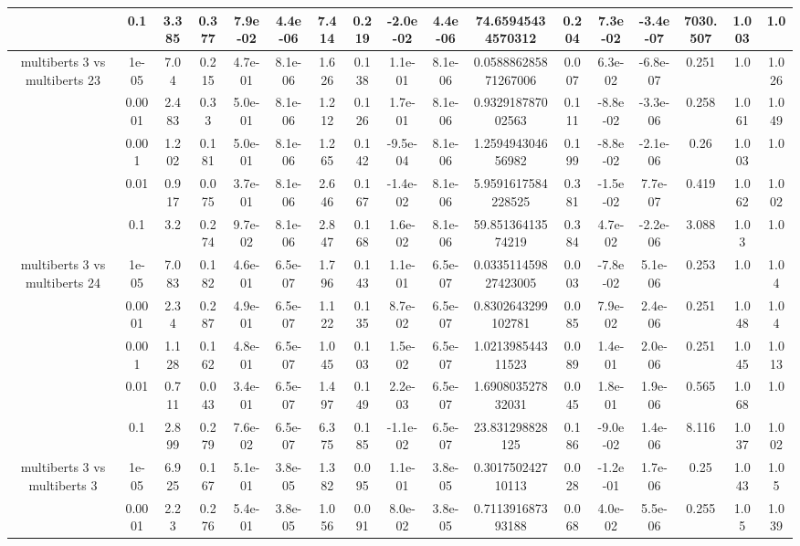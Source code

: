 \begin{tabular}{|c|c|c|c|c|c|c|c|c|c|c|c|c|c|c|c|c|}
 & 0.1 & 3.385 & 0.377 & 7.9e-02 & 4.4e-06 & 7.414 & 0.219 & -2.0e-02 & 4.4e-06 & 74.65945434570312 & 0.204 & 7.3e-02 & -3.4e-07 & 7030.507 & 1.003 & 1.0 \\
\hline
\multirow{5}{*}{multiberts 3 vs multiberts 23} & 1e-05 & 7.04 & 0.215 & 4.7e-01 & 8.1e-06 & 1.626 & 0.138 & 1.1e-01 & 8.1e-06 & 0.058886285871267006 & 0.007 & 6.3e-02 & -6.8e-07 & 0.251 & 1.0 & 1.026 \\
 & 0.0001 & 2.483 & 0.33 & 5.0e-01 & 8.1e-06 & 1.212 & 0.126 & 1.7e-01 & 8.1e-06 & 0.932918787002563 & 0.111 & -8.8e-02 & -3.3e-06 & 0.258 & 1.061 & 1.049 \\
 & 0.001 & 1.202 & 0.181 & 5.0e-01 & 8.1e-06 & 1.265 & 0.142 & -9.5e-04 & 8.1e-06 & 1.259494304656982 & 0.199 & -8.8e-02 & -2.1e-06 & 0.26 & 1.003 & 1.0 \\
 & 0.01 & 0.917 & 0.075 & 3.7e-01 & 8.1e-06 & 2.646 & 0.167 & -1.4e-02 & 8.1e-06 & 5.9591617584228525 & 0.381 & -1.5e-02 & 7.7e-07 & 0.419 & 1.062 & 1.002 \\
 & 0.1 & 3.2 & 0.274 & 9.7e-02 & 8.1e-06 & 2.847 & 0.168 & 1.6e-02 & 8.1e-06 & 59.85136413574219 & 0.384 & 4.7e-02 & -2.2e-06 & 3.088 & 1.03 & 1.0 \\
\hline
\multirow{5}{*}{multiberts 3 vs multiberts 24} & 1e-05 & 7.083 & 0.182 & 4.6e-01 & 6.5e-07 & 1.796 & 0.143 & 1.1e-01 & 6.5e-07 & 0.033511459827423005 & 0.003 & -7.8e-02 & 5.1e-06 & 0.253 & 1.0 & 1.04 \\
 & 0.0001 & 2.34 & 0.287 & 4.9e-01 & 6.5e-07 & 1.122 & 0.135 & 8.7e-02 & 6.5e-07 & 0.8302643299102781 & 0.085 & 7.9e-02 & 2.4e-06 & 0.251 & 1.048 & 1.04 \\
 & 0.001 & 1.128 & 0.162 & 4.8e-01 & 6.5e-07 & 1.045 & 0.103 & 1.5e-02 & 6.5e-07 & 1.021398544311523 & 0.089 & 1.4e-01 & 2.0e-06 & 0.251 & 1.045 & 1.013 \\
 & 0.01 & 0.711 & 0.043 & 3.4e-01 & 6.5e-07 & 1.497 & 0.149 & 2.2e-03 & 6.5e-07 & 1.690803527832031 & 0.045 & 1.8e-01 & 1.9e-06 & 0.565 & 1.068 & 1.0 \\
 & 0.1 & 2.899 & 0.279 & 7.6e-02 & 6.5e-07 & 6.375 & 0.185 & -1.1e-02 & 6.5e-07 & 23.831298828125 & 0.186 & -9.0e-02 & 1.4e-06 & 8.116 & 1.037 & 1.002 \\
\hline
\multirow{5}{*}{multiberts 3 vs multiberts 3} & 1e-05 & 6.925 & 0.167 & 5.1e-01 & 3.8e-05 & 1.382 & 0.095 & 1.1e-01 & 3.8e-05 & 0.301750242710113 & 0.028 & -1.2e-01 & 1.7e-06 & 0.25 & 1.043 & 1.05 \\
 & 0.0001 & 2.23 & 0.276 & 5.4e-01 & 3.8e-05 & 1.056 & 0.091 & 8.0e-02 & 3.8e-05 & 0.711391687393188 & 0.068 & 4.0e-02 & 5.5e-06 & 0.255 & 1.05 & 1.039 \\

\end{tabular}
